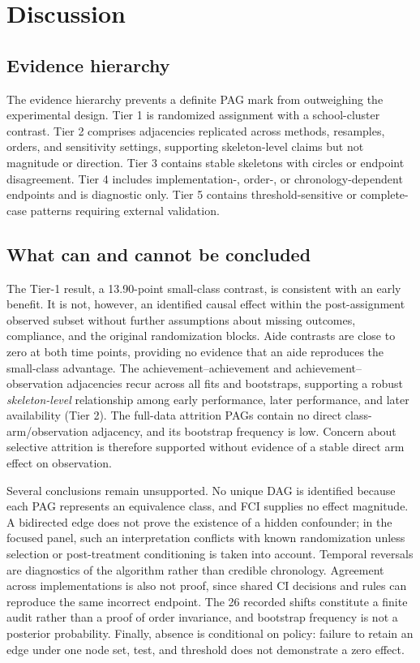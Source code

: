 \documentclass[11pt,a4paper]{article}
\theoremstyle{definition}
\begin{document}
\section{Discussion}
\label{sec:interpretation}

\subsection{Evidence hierarchy}

The evidence hierarchy prevents a definite PAG mark from outweighing the
experimental design. Tier 1 is randomized assignment with a school-cluster
contrast. Tier 2 comprises adjacencies replicated across methods, resamples,
orders, and sensitivity settings, supporting skeleton-level claims but not
magnitude or direction. Tier 3 contains stable skeletons with circles or
endpoint disagreement. Tier 4 includes implementation-, order-, or
chronology-dependent endpoints and is diagnostic only. Tier 5 contains
threshold-sensitive or complete-case patterns requiring external validation.

\subsection{What can and cannot be concluded}

The Tier-1 result, a 13.90-point small-class contrast, is consistent with an
early benefit. It is not, however, an identified causal effect within the
post-assignment observed subset without further assumptions about missing
outcomes, compliance, and the original randomization blocks. Aide contrasts
are close to zero at both time points, providing no evidence that an aide
reproduces the small-class advantage. The achievement--achievement and
achievement--observation adjacencies recur across all fits and bootstraps,
supporting a robust \emph{skeleton-level} relationship among early
performance, later performance, and later availability (Tier 2). The
full-data attrition PAGs contain no direct class-arm/observation adjacency,
and its bootstrap frequency is low. Concern about selective attrition is
therefore supported without evidence of a stable direct arm effect on
observation.

Several conclusions remain unsupported. No unique DAG is identified because
each PAG represents an equivalence class, and FCI supplies no effect
magnitude. A bidirected edge does not prove the existence of a hidden
confounder; in the focused panel, such an interpretation conflicts with known
randomization unless selection or post-treatment conditioning is taken into
account. Temporal reversals are diagnostics of the algorithm rather than
credible chronology. Agreement across implementations is also not proof,
since shared CI decisions and rules can reproduce the same incorrect
endpoint. The 26 recorded shifts constitute a finite audit rather than a
proof of order invariance, and bootstrap frequency is not a posterior
probability. Finally, absence is conditional on policy: failure to retain an
edge under one node set, test, and threshold does not demonstrate a zero
effect.
\end{document}

